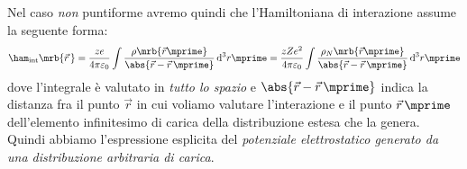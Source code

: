 Nel caso \textit{non} puntiforme avremo quindi che l'Hamiltoniana di
interazione assume la seguente forma:
\begin{equation}
	\ham_\text{int} \mrb{\vec{r}\,} = \frac{ze}{4\pi \varepsilon_0} \int
	\frac{\rho\mrb{\vec{r}\mprime}}{\abs{\vec{r} - \vec{r}\,\mprime}} \,
	\mathrm{d}^3r\mprime
	= \frac{zZe^2}{4\pi \varepsilon_0} \int
	\frac{\rho_N\mrb{\vec{r}\mprime}}{\abs{\vec{r} - \vec{r}\,\mprime}} \,
	\mathrm{d}^3r\mprime
	\label{eq:ham_int_estesa}
\end{equation}
dove l'integrale è valutato in \textit{tutto lo spazio} e $\abs{\vec{r} -
		\vec{r}\,\mprime}$ indica la distanza fra il punto $\vec{r}$ in cui voliamo
valutare l'interazione e il punto $\vec{r}\,\mprime$ dell'elemento infinitesimo
di carica della distribuzione estesa che la genera. Quindi abbiamo
l'espressione esplicita del \textit{potenziale elettrostatico generato da una
	distribuzione arbitraria di carica}.

